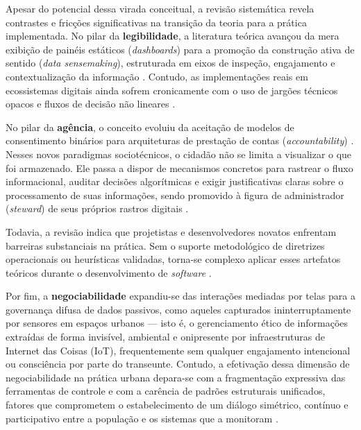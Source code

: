 \documentclass[12pt]{article}
\begin{document}
    Apesar do potencial dessa virada conceitual, a revisão sistemática revela contrastes e fricções significativas na transição da teoria para a prática implementada. No pilar da \textbf{legibilidade}, a literatura teórica avançou da mera exibição de painéis estáticos (\textit{dashboards}) para a promoção da construção ativa de sentido (\textit{data sensemaking}), estruturada em eixos de inspeção, engajamento e contextualização da informação \cite{capeleti2023heuristic, Yuan20243615}. Contudo, as implementações reais em ecossistemas digitais ainda sofrem cronicamente com o uso de jargões técnicos opacos e fluxos de decisão não lineares \cite{sailaja2021exploring}.

    No pilar da \textbf{agência}, o conceito evoluiu da aceitação de modelos de consentimento binários para arquiteturas de prestação de contas (\textit{accountability}) \cite{janecek2018ownership}. Nesses novos paradigmas sociotécnicos, o cidadão não se limita a visualizar o que foi armazenado. Ele passa a dispor de mecanismos concretos para rastrear o fluxo informacional, auditar decisões algorítmicas e exigir justificativas claras sobre o processamento de suas informações, sendo promovido à figura de administrador (\textit{steward}) de seus próprios rastros digitais \cite{angelopoulos2021stewardship}. 

    Todavia, a revisão indica que projetistas e desenvolvedores novatos enfrentam barreiras substanciais na prática. Sem o suporte metodológico de diretrizes operacionais ou heurísticas validadas, torna-se complexo aplicar esses artefatos teóricos durante o desenvolvimento de \textit{software} \cite{Strey2019Human}. 

    Por fim, a \textbf{negociabilidade} expandiu-se das interações mediadas por telas para a governança difusa de dados passivos, como aqueles capturados ininterruptamente por sensores em espaços urbanos \cite{Sailaja2024334} — isto é, o gerenciamento ético de informações extraídas de forma invisível, ambiental e onipresente por infraestruturas de Internet das Coisas (IoT), frequentemente sem qualquer engajamento intencional ou consciência por parte do transeunte. Contudo, a efetivação dessa dimensão de negociabilidade na prática urbana depara-se com a fragmentação expressiva das ferramentas de controle e com a carência de padrões estruturais unificados, fatores que comprometem o estabelecimento de um diálogo simétrico, contínuo e participativo entre a população e os sistemas que a monitoram \cite{mu2024institutional}.
    
\end{document}
